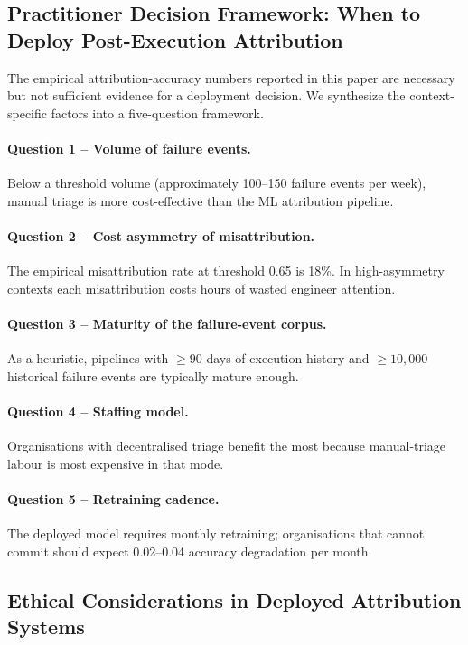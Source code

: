 \documentclass[11pt,a4paper]{article}
\begin{document}
\subsection{Practitioner Decision Framework: When to Deploy Post-Execution Attribution}
\label{sec:f_decision_framework}

The empirical attribution-accuracy numbers reported in this paper are necessary but not sufficient evidence for a deployment decision. We synthesize the context-specific factors into a five-question framework.

\paragraph{Question 1 -- Volume of failure events.} Below a threshold volume (approximately 100--150 failure events per week), manual triage is more cost-effective than the ML attribution pipeline.

\paragraph{Question 2 -- Cost asymmetry of misattribution.} The empirical misattribution rate at threshold 0.65 is 18\%. In high-asymmetry contexts each misattribution costs hours of wasted engineer attention.

\paragraph{Question 3 -- Maturity of the failure-event corpus.} As a heuristic, pipelines with $\geq 90$ days of execution history and $\geq 10{,}000$ historical failure events are typically mature enough.

\paragraph{Question 4 -- Staffing model.} Organisations with decentralised triage benefit the most because manual-triage labour is most expensive in that mode.

\paragraph{Question 5 -- Retraining cadence.} The deployed model requires monthly retraining; organisations that cannot commit should expect 0.02--0.04 accuracy degradation per month.

\subsection{Ethical Considerations in Deployed Attribution Systems}
\label{sec:ethics}
\end{document}
